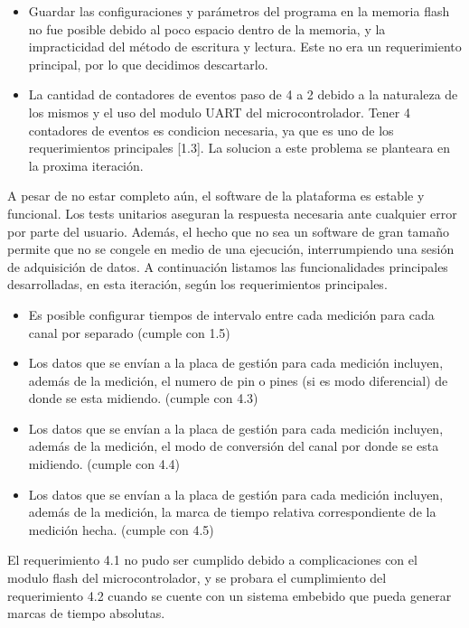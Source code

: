 \begin{itemize}
\item Guardar las configuraciones y parámetros del programa en la memoria flash no fue posible debido al poco espacio dentro de la memoria, y la impracticidad del método de escritura y lectura. Este no era un requerimiento principal, por lo que decidimos descartarlo.
\item La cantidad de contadores de eventos paso de 4 a 2 debido a la naturaleza de los mismos y el uso del modulo UART del microcontrolador. Tener 4 contadores de eventos es condicion necesaria, ya que es uno de los requerimientos principales [1.3]. La solucion a este problema se planteara en la proxima iteración.
\end{itemize}

A pesar de no estar completo aún, el software de la plataforma es estable y funcional. Los tests unitarios aseguran la respuesta necesaria ante cualquier error por parte del usuario. Además, el hecho que no sea un software de gran tamaño permite que no se congele en medio de una ejecución, interrumpiendo una sesión de adquisición de datos. A continuación listamos las funcionalidades principales desarrolladas, en esta iteración, según los requerimientos principales.

\begin{itemize}
\item Es posible configurar tiempos de intervalo entre cada medición para cada canal por separado (cumple con 1.5)
\item Los datos que se envían a la placa de gestión para cada medición incluyen, además de la medición, el numero de pin o pines (si es modo diferencial) de donde se esta midiendo. (cumple con 4.3)  
\item Los datos que se envían a la placa de gestión para cada medición incluyen, además de la medición, el modo de conversión del canal por donde se esta midiendo. (cumple con 4.4)
\item Los datos que se envían a la placa de gestión para cada medición incluyen, además de la medición, la marca de tiempo relativa correspondiente de la medición hecha. (cumple con 4.5)
\end{itemize}

El requerimiento 4.1 no pudo ser cumplido debido a complicaciones con el modulo flash del microcontrolador, y se probara el cumplimiento del requerimiento 4.2 cuando se cuente con un sistema embebido que pueda generar marcas de tiempo absolutas.


